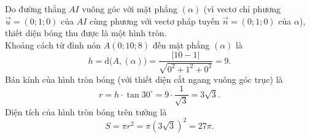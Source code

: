 \begin{ex}
{\begin{itemchoice}
			Do đường thẳng $AI$ vuông góc với mặt phẳng $(\alpha)$ (vì vectơ chỉ phương $\overrightarrow{u}=(0;1;0)$ của $AI$ cùng phương với vectơ pháp tuyến $\overrightarrow{n}=(0;1;0)$ của $\alpha$), thiết diện bóng thu được là một hình tròn.\\
			Khoảng cách từ đỉnh nón $A(0;10;8)$ đến mặt phẳng $(\alpha)$ là
			\[h=\mathrm{d}\big(A,(\alpha)\big)=\dfrac{|10-1|}{\sqrt{0^2+1^2+0^2}}=9.\]
			Bán kính của hình tròn bóng (với thiết diện cắt ngang vuông góc trục) là 
			\[r=h \cdot \tan 30^\circ=9 \cdot \dfrac{1}{\sqrt{3}}=3\sqrt{3}.\]
			Diện tích của hình tròn bóng trên tường là 
			\[S=\pi r^2=\pi\left(3\sqrt{3}\right)^2=27\pi.\]
		\end{itemchoice}
	}
\end{ex}

